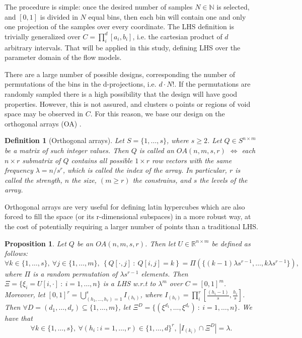 \documentclass{article}
\newtheorem{definition}[theorem]{Definition}
\newtheorem{proposition}[theorem]{Proposition}
\begin{document}
The procedure is simple: once the desired number of samples $N\in\mathbb N$ is selected, and $[0,1]$ is divided in $N$ equal bins, then each bin will contain one and only one projection of the samples over every coordinate. The LHS definition is trivially generalized over $C=\prod^d_i [a_i, b_i]$, i.e. the cartesian product of $d$ arbitrary intervals. That will be applied in this study, defining LHS over the parameter domain of the flow models.

There are a large number of possible designs, corresponding the number of permutations of the bins in the d-projections, i.e. $d\cdot N!$. If the permutations are randomly sampled there is a high possibility that the design will have good properties. However, this is not assured, and clusters o points or regions of void space may be observed in $C$. For this reason, we base our design on the orthogonal arrays (OA) \citep{Owen1992a,Tang1993}.

\begin{definition}[Orthogonal arrays]
Let $S=\{1,\dots,s\}$, where $s\ge 2$. Let $Q\in S^{n\times m}$ be a matrix of such integer values. Then $Q$ is called an $OA(n,m,s,r)$ $\Longleftrightarrow$ each $n\times r$ submatrix of $Q$ contains all possible $1\times r$ row vectors with the same frequency $\lambda=n/s^r$, which is called the index of the array. In particular, $r$ is called the strength, $n$ the size, $(m\ge r)$ the constrains, and $s$ the levels of the array.
\end{definition}

Orthogonal arrays are very useful for defining latin hypercubes which are also forced to fill the space (or its r-dimensional subspaces) in a more robust way, at the cost of potentially requiring a larger number of points than a traditional LHS.

\begin{proposition}
Let $Q$ be an $OA(n,m,s,r)$. Then let $U\in\mathbb R^{n\times m}$ be defined as follows:
$$\forall k\in \{1,\dots,s\},\ \forall j\in \{1,\dots,m\},\ \left\{Q[\cdot,j]\ :\ Q[i,j]=k\right\} = \Pi\left(\{(k-1)\lambda s^{r-1},\dots, k\lambda s^{r-1}\}\right),$$
where $\Pi$ is a random permutation of $\lambda s^{r-1}$ elements. Then $\Xi=\{\xi_i=U[i,\cdot]\ :\ i=1,\dots,n\}$ is a LHS w.r.t to $\lambda^m$ over $C=[0,1]^m$. Moreover, let $[0,1]^r=\bigcup_{(h_1,\dots,h_r)=1}^{s} I_{(h_i)}$, where $I_{(h_i)}=\prod^r_i[\frac{(h_i-1)}{s},\frac{h_i}{s}]$. Then $\forall D=(d_1,\dots,d_r)\subseteq \{1,\dots,m\}$, let $\Xi^D=\{(\xi^{d_1},\dots,\xi^{d_r})\ :\ i=1,\dots,n\}$. We have that
$$\forall k\in \{1,\dots,s\},\ \forall (h_i\ : i=1,\dots,r)\in\{1,\dots,d\}^r,\ \left|I_{(k_i)}\cap\Xi^D\right|=\lambda.$$
\end{proposition}
\end{document}
